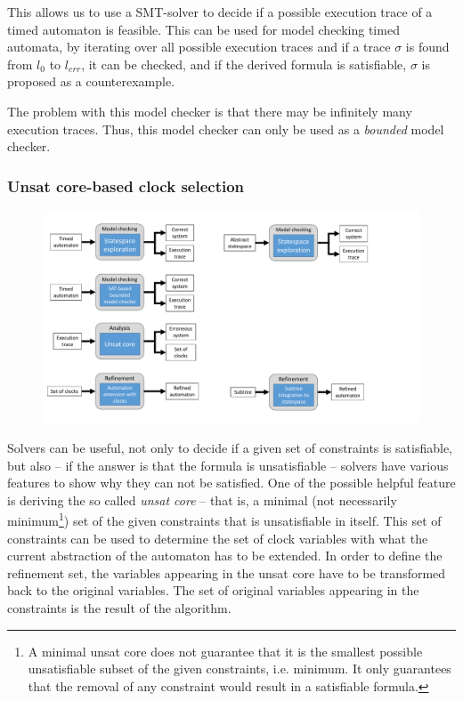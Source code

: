 This allows us to use a SMT-solver to decide if a possible execution trace of a timed automaton is feasible. This can be used for model checking timed automata, by iterating over all possible execution traces and if a trace $\sigma$ is found from $l_0$ to $l_{err}$, it can be checked, and if the derived formula is satisfiable, $\sigma$ is proposed as a counterexample. 

The problem with this model checker is that there may be infinitely many execution traces. Thus, this model checker can only be used as a \emph{bounded} model checker.



\subsubsection{Unsat core-based clock selection}

\begin{figure}[h!]
	\centering
	\includegraphics[width=.7\textwidth]{include/figures/modules_ta_anal}
\end{figure}

Solvers can be useful, not only to decide if a given set of constraints is satisfiable, but also -- if the answer is that the formula is unsatisfiable -- solvers have various features to show why they can not be satisfied. One of the possible helpful feature is deriving the so called \emph{unsat core} -- that is, a minimal (not necessarily minimum\footnote{A minimal unsat core does not guarantee that it is the smallest possible unsatisfiable subset of the given constraints, i.e. minimum. It only guarantees that the removal of any constraint would result in a satisfiable formula.}) set of the given constraints that is unsatisfiable in itself. This set of constraints can be used to determine the set of clock variables with what the current abstraction of the automaton has to be extended. In order to define the refinement set, the variables appearing in the unsat core have to be transformed back to the original variables. The set of original variables appearing in the constraints is the result of the algorithm.


